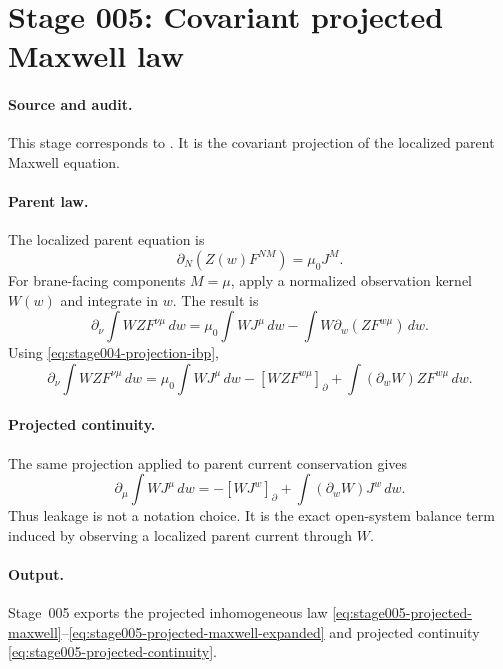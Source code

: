 \section[Stage 005]{Stage 005: Covariant projected Maxwell law}
\label{stage:005}


\paragraph{Source and audit.}
This stage corresponds to
.
It is the covariant projection of the localized parent Maxwell equation.

\paragraph{Parent law.}
The localized parent equation is
\begin{equation}
\label{eq:stage005-parent-maxwell}
\partial_N\!\left(Z(w)F^{NM}\right)=\mu_0J^M .
\end{equation}
For brane-facing components \(M=\mu\), apply a normalized observation kernel
\(W(w)\) and integrate in \(w\).  The result is
\begin{equation}
\label{eq:stage005-projected-maxwell}
\partial_\nu\!\int WZ F^{\nu\mu}\,dw
=
\mu_0\int WJ^\mu\,dw
-\int W\partial_w(ZF^{w\mu})\,dw.
\end{equation}
Using \eqref{eq:stage004-projection-ibp},
\begin{equation}
\label{eq:stage005-projected-maxwell-expanded}
\partial_\nu\!\int WZ F^{\nu\mu}\,dw
=
\mu_0\int WJ^\mu\,dw
-[WZF^{w\mu}]_{\partial}
+\int (\partial_wW)ZF^{w\mu}\,dw .
\end{equation}

\paragraph{Projected continuity.}
The same projection applied to parent current conservation gives
\begin{equation}
\label{eq:stage005-projected-continuity}
\partial_\mu\!\int WJ^\mu\,dw
=-[WJ^w]_{\partial}+\int(\partial_wW)J^w\,dw .
\end{equation}
Thus leakage is not a notation choice.  It is the exact open-system balance
term induced by observing a localized parent current through \(W\).

\paragraph{Output.}
Stage~005 exports the projected inhomogeneous law
\eqref{eq:stage005-projected-maxwell}--\eqref{eq:stage005-projected-maxwell-expanded}
and projected continuity \eqref{eq:stage005-projected-continuity}.
